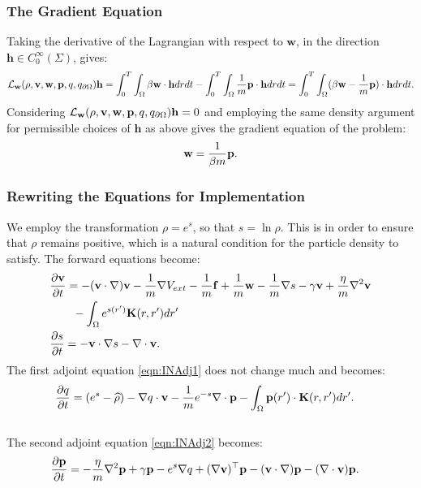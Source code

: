 \subsubsection{The Gradient Equation}
Taking the derivative of the Lagrangian with respect to $\mathbf{w}$, in the direction $\mathbf{h} \in C_0^\infty(\Sigma)$, gives:
\begin{align*}
\mathcal{L}_{\mathbf{w}}(\rho,\mathbf{v},\mathbf{w},\mathbf{p},q,{q}_{\partial \Omega}) \mathbf{h}= \int_0^T \int_\Omega \beta \mathbf{w} \cdot \mathbf{h} dr dt - \int_0^T \int_\Omega \frac{1}{m} \mathbf{p} \cdot \mathbf{h} dr dt 
= \int_0^T \int_\Omega ( \beta \mathbf{w} - \frac{1}{m}\mathbf{p}) \cdot \mathbf{h} dr dt.
\end{align*}
Considering $\mathcal{L}_{\mathbf{w}}(\rho,\mathbf{v},\mathbf{w},\mathbf{p},q,{q}_{\partial \Omega}) \mathbf{h} =0$ and employing the same density argument for permissible choices of $\mathbf{h}$ as above gives the gradient equation of the problem:
\begin{align*}
 \mathbf{w} = \frac{1}{\beta m} \mathbf{p}.
\end{align*}

\subsubsection{Rewriting the Equations for Implementation} \label{sec:INImplementation}
We employ the transformation $\rho = e^s$, so that $s = \ln \rho$. This is in order to ensure that $\rho$ remains positive, which is a natural condition for the particle density to satisfy. 
The forward equations become:
\begin{align*}
& \frac{\partial \Stav}{\partial t}= -  (\Stav \cdot \nabla)\Stav - \frac{1}{m} \nabla V_{ext} -\frac{1}{m}\Con +\frac{1}{m} \mathbf{w} - \frac{1}{m} \nabla s - \gamma \Stav +  \frac{\eta}{m} \nabla^2 \Stav\\ %
&\quad \quad  -\int_\Omega e^{s(r')} \mathbf{K}(r,r')dr' \notag\\
 &\frac{\partial s}{\partial t} = - \Stav \cdot \nabla s - \nabla \cdot \Stav. %
\end{align*}
The first adjoint equation \eqref{eqn:INAdj1} does not change much and becomes:
\begin{align*}
&  \frac{\partial q}{\partial t}  = (e^s - \widehat {\rho})- \nabla q \cdot \mathbf{v}-\frac{1}{m} e^{-s}\nabla \cdot \mathbf{p}-  \int_\Omega  \mathbf{p}(r') \cdot\mathbf{K}(r,r')   dr' .
\end{align*}
\\
The second adjoint equation \eqref{eqn:INAdj2} becomes:
\begin{align*}
&\frac{\partial \mathbf{p}}{\partial t} =  - \frac{\eta}{m} \nabla^2 \mathbf{p}  + \gamma\mathbf{p}-e^s\nabla q +(\nabla \mathbf{v})^\top\mathbf{p} 
- (\mathbf{v} \cdot \nabla)\mathbf{p} -  (\nabla \cdot \mathbf{v})\mathbf{p}   .
\end{align*}

